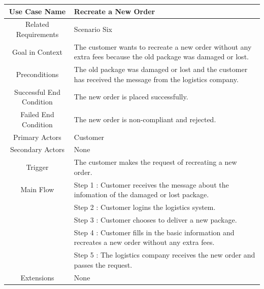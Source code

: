 \documentclass[12pt]{scrreprt}
\begin{document}
\begin{table}
  \centering
  \begin{tabular}{| c | p{11cm} |}
    \hline
    Use Case Name & Recreate a New Order\\
    \hline
    Related Requirements & Scenario Six\\
    \hline
    Goal in Context & The customer wants to recreate a new order without any
    extra fees because the old package was damaged or lost.\\
    \hline
    Preconditions & The old package was damaged or lost and the customer has
    received the message from the logistics company.\\
    \hline
    Successful End Condition & The new order is placed successfully.\\
    \hline
    Failed End Condition & The new order is non-compliant and rejected.\\
    \hline
    Primary Actors & Customer\\
    \hline
    Secondary Actors & None\\
    \hline
    Trigger & The customer makes the request of recreating a new order.\\
    \hline
    Main Flow & Step 1 : Customer receives the message about the infomation
    of the damaged or lost package.\\
    & Step 2 : Customer logins the logistics system.\\
    & Step 3 : Customer chooses to deliver a new package.\\
    & Step 4 : Customer fills in the basic information and recreates a new
    order without any extra fees.\\
    & Step 5 : The logistics company receives the new order and passes
    the request.\\
    \hline
    Extensions & None\\
    \hline
  \end{tabular}
\end{table}
\end{document}
